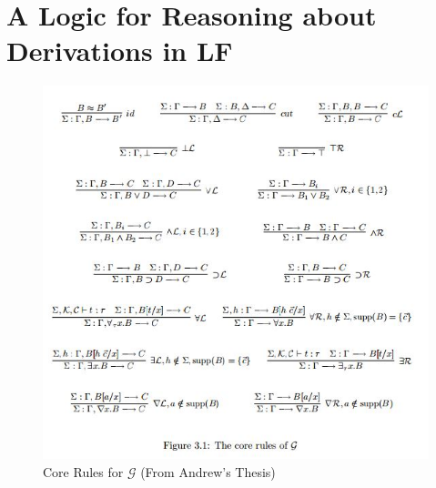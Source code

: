 \documentclass[12pt]{article}
\begin{document}
\section{A Logic for Reasoning about Derivations in LF}
\begin{figure}
\includegraphics{Figure3-1.JPG}
\caption{Core Rules for $\mathcal{G}$ (From Andrew's Thesis)}\label{fig:metalogicG}
\end{figure}
\end{document}
